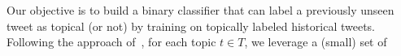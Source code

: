 


Our objective is to build a binary classifier that can label
a previously unseen tweet as topical (or not) by training on 
topically labeled historical tweets.  
%
%
%
Following
the approach of~\cite{lin2011smoothing}, for each topic $t \in T$, we leverage a (small) set of
